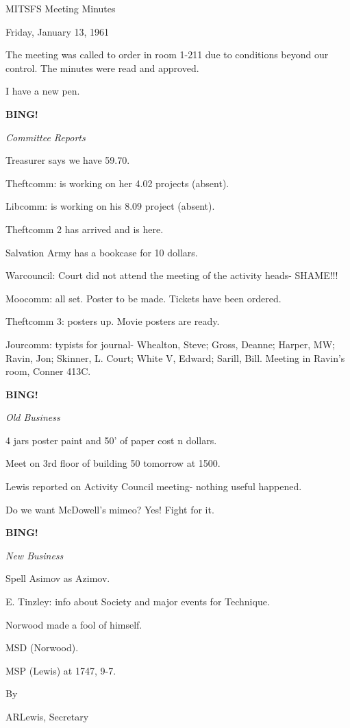 \documentclass[12pt]{article}
\newcommand{\bing}{{\bf BING!} }
\newcommand{\goto}[1]{\bing \vskip 12pt \centerline{{\em{#1}}}}
\begin{document}
\begin{center}

MITSFS Meeting Minutes

Friday, January 13, 1961

\end{center}
 
\vspace{12pt}

\setlength{\parskip}{6pt}

\noindent
The meeting was called to order in room 1-211 due to conditions beyond our control. The minutes were read and approved.

I have a new pen.

\goto{Committee Reports}

Treasurer says we have 59.70.

Theftcomm: is working on her 4.02 projects (absent).

Libcomm: is working on his 8.09 project (absent).

Theftcomm 2 has arrived and is here.

Salvation Army has a bookcase for 10 dollars.

Warcouncil: Court did not attend the meeting of the activity heads- SHAME!!!

Moocomm: all set. Poster to be made. Tickets have been ordered.

Theftcomm 3: posters up. Movie posters are ready.

Jourcomm: typists for journal- Whealton, Steve; Gross, Deanne; Harper, MW; Ravin, Jon; Skinner, L. Court; White V, Edward; Sarill, Bill. Meeting in Ravin's room, Conner 413C.

\goto{Old Business}

4 jars poster paint and 50' of paper cost n dollars.

Meet on 3rd floor of building 50 tomorrow at 1500.

Lewis reported on Activity Council meeting- nothing useful happened.

Do we want McDowell's mimeo? Yes! Fight for it.

\goto{New Business}

Spell Asimov as Azimov.

E. Tinzley: info about Society and major events for Technique.

Norwood made a fool of himself.

MSD (Norwood).

MSP (Lewis) at 1747, 9-7.

\vspace{12pt}

\centerline{By}
\centerline{ARLewis, Secretary}
\end{document}
